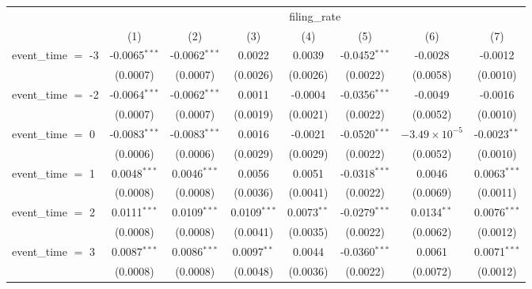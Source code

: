 
\begingroup
\centering
\begin{tabular}{lccccccc}
   \toprule
    & \multicolumn{7}{c}{filing\_rate}\\
                            & (1)             & (2)             & (3)            & (4)           & (5)             & (6)                    & (7)\\  
   \midrule 
   event\_time $=$ -3       & -0.0065$^{***}$ & -0.0062$^{***}$ & 0.0022         & 0.0039        & -0.0452$^{***}$ & -0.0028                & -0.0012\\   
                            & (0.0007)        & (0.0007)        & (0.0026)       & (0.0026)      & (0.0022)        & (0.0058)               & (0.0010)\\   
   event\_time $=$ -2       & -0.0064$^{***}$ & -0.0062$^{***}$ & 0.0011         & -0.0004       & -0.0356$^{***}$ & -0.0049                & -0.0016\\   
                            & (0.0007)        & (0.0007)        & (0.0019)       & (0.0021)      & (0.0022)        & (0.0052)               & (0.0010)\\   
   event\_time $=$ 0        & -0.0083$^{***}$ & -0.0083$^{***}$ & 0.0016         & -0.0021       & -0.0520$^{***}$ & $-3.49\times 10^{-5}$  & -0.0023$^{**}$\\   
                            & (0.0006)        & (0.0006)        & (0.0029)       & (0.0029)      & (0.0022)        & (0.0052)               & (0.0010)\\   
   event\_time $=$ 1        & 0.0048$^{***}$  & 0.0046$^{***}$  & 0.0056         & 0.0051        & -0.0318$^{***}$ & 0.0046                 & 0.0063$^{***}$\\   
                            & (0.0008)        & (0.0008)        & (0.0036)       & (0.0041)      & (0.0022)        & (0.0069)               & (0.0011)\\   
   event\_time $=$ 2        & 0.0111$^{***}$  & 0.0109$^{***}$  & 0.0109$^{***}$ & 0.0073$^{**}$ & -0.0279$^{***}$ & 0.0134$^{**}$          & 0.0076$^{***}$\\   
                            & (0.0008)        & (0.0008)        & (0.0041)       & (0.0035)      & (0.0022)        & (0.0062)               & (0.0012)\\   
   event\_time $=$ 3        & 0.0087$^{***}$  & 0.0086$^{***}$  & 0.0097$^{**}$  & 0.0044        & -0.0360$^{***}$ & 0.0061                 & 0.0071$^{***}$\\   
                            & (0.0008)        & (0.0008)        & (0.0048)       & (0.0036)      & (0.0022)        & (0.0072)               & (0.0012)\\   

\end{tabular}
